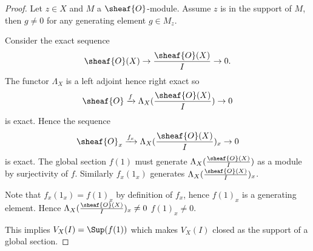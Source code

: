 
\begin{proof}
Let $z\in X$ and $M$ a $\sheaf{O}$-module. Assume $z$ is in the support of $M$, then $g\neq 0$ for any generating element $g\in M_z$. 

Consider the exact sequence 
\[\sheaf{O}(X)\rightarrow \frac{\sheaf{O}(X)}{I} \rightarrow 0.\]
The functor $\Lambda_X$ is a left adjoint hence right exact so 
\[\sheaf{O} \xrightarrow{f} \Lambda_X(\frac{\sheaf{O}(X)}{I}) \rightarrow 0\]
is exact.
Hence the sequence
\[\sheaf{O}_x \xrightarrow{f_x} \Lambda_X(\frac{\sheaf{O}(X)}{I})_x \rightarrow 0\]
is exact. 
The global section $f(1)$ must generate $\Lambda_X(\frac{\sheaf{O}(X)}{I})$ as a module by surjectivity of $f$.
Similarly $f_x(1_x)$ generates $\Lambda_X(\frac{\sheaf{O}(X)}{I})_x$.

Note that $f_x(1_x) = f(1)_x$ by definition of $f_x$, hence $f(1)_x$ is a generating element.
Hence $\Lambda_X(\frac{\sheaf{O}(X)}{I})_x \neq 0$ \iff $f(1)_x \neq 0$. 

This implies $V_X(I) = \Sup(f(1))$ which makes $V_X(I)$ closed as the support of a global section.
\end{proof}